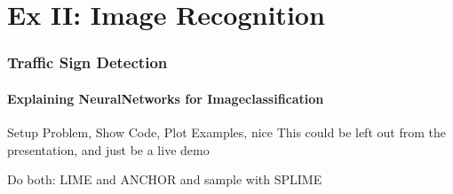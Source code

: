\section{Ex II: Image Recognition}


\begin{frame}
	\frametitle{Traffic Sign Detection}
	\framesubtitle{Explaining NeuralNetworks for Imageclassification}
	Setup Problem, Show Code, Plot Examples, nice
	This could be left out from the presentation, and just be a live demo
	
	Do both: LIME and ANCHOR and sample with SPLIME
\end{frame}